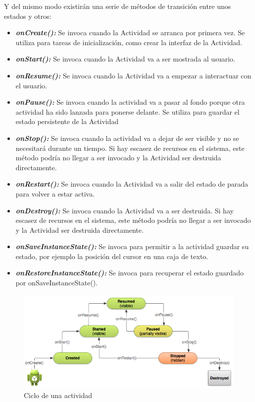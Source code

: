 Y del mismo modo existirán una serie de métodos de transición entre unos estados y otros: 
\begin{itemize}	
	\item \emph{\textbf{onCreate(): }} Se invoca cuando la Actividad se arranca por primera vez. Se utiliza para tareas de inicialización, como crear la interfaz de la Actividad. 
	
	\item \emph{\textbf{onStart(): }} Se invoca cuando la Actividad va a ser mostrada al usuario.
	
	\item \emph{\textbf{onResume(): }} Se invoca cuando la Actividad va a empezar a interactuar con el usuario. 
	
	\item \emph{\textbf{onPause(): }} Se invoca cuando la actividad va a pasar al fondo porque otra actividad ha sido lanzada para ponerse delante. Se utiliza para guardar el estado persistente de la Actividad 
	
	\item \emph{\textbf{onStop(): }} Se invoca cuando la actividad va a dejar de ser visible y no se necesitará durante un tiempo. Si hay escasez de recursos en el sistema, este método podría no llegar a ser invocado y la Actividad ser destruida directamente. 
	
	\item \emph{\textbf{onRestart(): }} Se invoca cuando la Actividad va a salir del estado de parada para volver a estar activa. 
	
	\item \emph{\textbf{onDestroy(): }} Se invoca cuando la Actividad va a ser destruida. Si hay escasez de recursos en el sistema, este método podría no llegar a ser invocado y la Actividad ser destruida directamente. 
  
  	\item \emph{\textbf{onSaveInstanceState(): }} Se invoca para permitir a la actividad guardar su estado, por ejemplo la posición del cursor en una caja de texto. 
  	
 	\item \emph{\textbf{onRestoreInstanceState(): }} Se invoca para recuperar el estado guardado por onSaveInstanceState(). 
\end{itemize}

\begin{figure}[H]
	\centering
	\includegraphics[width=0.95\linewidth]{figuras/estados}
	\caption{Ciclo de una actividad}
	\label{fig:estados}
\end{figure}



